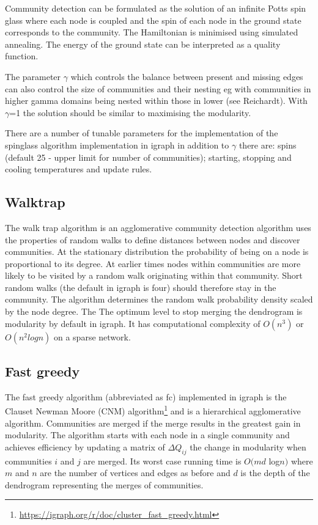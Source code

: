 Community detection can be formulated as the solution of an infinite Potts spin glass where each node is coupled and the spin of each node in the ground state corresponds to the community. The Hamiltonian is minimised using simulated annealing\cite{kirkpatrick1983optimization}.  The energy of the ground state can be interpreted as a quality function. 

The parameter $\gamma$ which controls the balance between present and missing edges can also control the size of communities and their nesting eg with communities in higher gamma domains being nested within those in lower (see Reichardt\cite{reichardt2006statistical}). With $\gamma$=1 the solution should be similar to maximising the modularity\cite{eaton2012spin}.

There are a number of tunable parameters for the implementation of the spinglass algorithm implementation in igraph in addition to $\gamma$ there are: spins (default 25 - upper limit for number of communities); starting, stopping and cooling temperatures and update rules. 

\subsection{Walktrap}
\label{sec:walktrap}
The walk trap algorithm is an agglomerative community detection algorithm uses the properties of random walks to define distances between nodes and discover communities. At the stationary distribution the probability of being on a node is proportional to its degree. At earlier times nodes within communities are more likely to be visited by a random walk originating within that community. Short random walks (the default in igraph is four) should therefore stay in the community. The algorithm determines the random walk probability density scaled by the node degree\cite{pons2005computing}. The  The optimum level to stop merging the dendrogram is modularity by default in igraph. It has computational complexity of $O(n^3)$\cite{danon2005comparing} or $O(n^2 logn)$ on a sparse network\cite{yang2016comparative}.

\subsection{Fast greedy}
The fast greedy algorithm (abbreviated as fc) implemented in igraph is the Clauset Newman Moore (CNM) algorithm\footnote{\url{https://igraph.org/r/doc/cluster_fast_greedy.html}} and is a hierarchical agglomerative algorithm. Communities are merged if the merge results in the greatest gain in modularity\cite{clauset2004finding}. The algorithm starts with each node in a single community and achieves efficiency by updating a matrix of $\Delta Q_{ij}$ the change in modularity when communities $i$ and $j$ are merged. Its worst case running time is $O(md$ log$ n)$ where $m$ and $n$ are the number of vertices and edges as before and $d$ is the depth of the dendrogram representing the merges of communities. 

